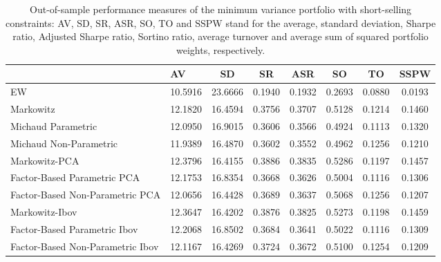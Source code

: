 \begin{table}

\caption{\label{tab:empirical_mvp}Out-of-sample performance measures of the minimum variance portfolio with short-selling constraints: AV, SD, SR, ASR, SO, TO and SSPW stand for the average, standard deviation, Sharpe ratio, Adjusted Sharpe ratio, Sortino ratio, average turnover and average sum of squared portfolio weights, respectively.}
\centering
\begin{tabular}[t]{l|l|c|c|c|c|c|c}
\hline
  & AV & SD & SR & ASR & SO & TO & SSPW\\
\hline
EW & 10.5916 & 23.6666 & 0.1940 & 0.1932 & 0.2693 & 0.0880 & 0.0193\\
\hline
Markowitz & 12.1820 & 16.4594 & 0.3756 & 0.3707 & 0.5128 & 0.1214 & 0.1460\\
\hline
Michaud Parametric & 12.0950 & 16.9015 & 0.3606 & 0.3566 & 0.4924 & 0.1113 & 0.1320\\
\hline
Michaud Non-Parametric & 11.9389 & 16.4870 & 0.3602 & 0.3552 & 0.4962 & 0.1256 & 0.1210\\
\hline
Markowitz-PCA & 12.3796 & 16.4155 & 0.3886 & 0.3835 & 0.5286 & 0.1197 & 0.1457\\
\hline
Factor-Based Parametric PCA & 12.1753 & 16.8354 & 0.3668 & 0.3626 & 0.5004 & 0.1116 & 0.1306\\
\hline
Factor-Based Non-Parametric PCA & 12.0656 & 16.4428 & 0.3689 & 0.3637 & 0.5068 & 0.1256 & 0.1207\\
\hline
Markowitz-Ibov & 12.3647 & 16.4202 & 0.3876 & 0.3825 & 0.5273 & 0.1198 & 0.1459\\
\hline
Factor-Based Parametric Ibov & 12.2068 & 16.8502 & 0.3684 & 0.3641 & 0.5022 & 0.1116 & 0.1309\\
\hline
Factor-Based Non-Parametric Ibov & 12.1167 & 16.4269 & 0.3724 & 0.3672 & 0.5100 & 0.1254 & 0.1209\\
\hline
\end{tabular}
\end{table}

